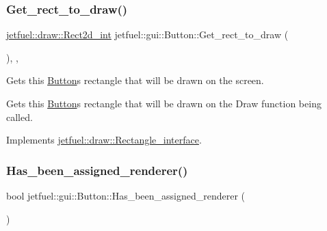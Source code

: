 \mbox{\label{classjetfuel_1_1gui_1_1Button_a99615af8c169d2274b1593a29fdaf7ca}} 
\subsubsection{\texorpdfstring{Get\+\_\+rect\+\_\+to\+\_\+draw()}{Get\_rect\_to\_draw()}}
{\footnotesize\ttfamily \hyperlink{classjetfuel_1_1draw_1_1Rect2d}{jetfuel\+::draw\+::\+Rect2d\+\_\+int} jetfuel\+::gui\+::\+Button\+::\+Get\+\_\+rect\+\_\+to\+\_\+draw (\begin{DoxyParamCaption}{ }\end{DoxyParamCaption})\hspace{0.3cm}{\ttfamily [inline]}, {\ttfamily [override]}, {\ttfamily [virtual]}}



Gets this \hyperlink{classjetfuel_1_1gui_1_1Button}{Button}\textquotesingle{}s rectangle that will be drawn on the screen. 

Gets this \hyperlink{classjetfuel_1_1gui_1_1Button}{Button}\textquotesingle{}s rectangle that will be drawn on the Draw function being called. 

Implements \hyperlink{classjetfuel_1_1draw_1_1Rectangle__interface_a03fd3b6842ab7b3065379caec407296f}{jetfuel\+::draw\+::\+Rectangle\+\_\+interface}.

\mbox{\label{classjetfuel_1_1gui_1_1Button_a52c175819af166cda4c000fc2e32fb25}} 
\subsubsection{\texorpdfstring{Has\+\_\+been\+\_\+assigned\+\_\+renderer()}{Has\_been\_assigned\_renderer()}}
{\footnotesize\ttfamily bool jetfuel\+::gui\+::\+Button\+::\+Has\+\_\+been\+\_\+assigned\+\_\+renderer (\begin{DoxyParamCaption}{ }\end{DoxyParamCaption})\hspace{0.3cm}{\ttfamily [inline]}}



